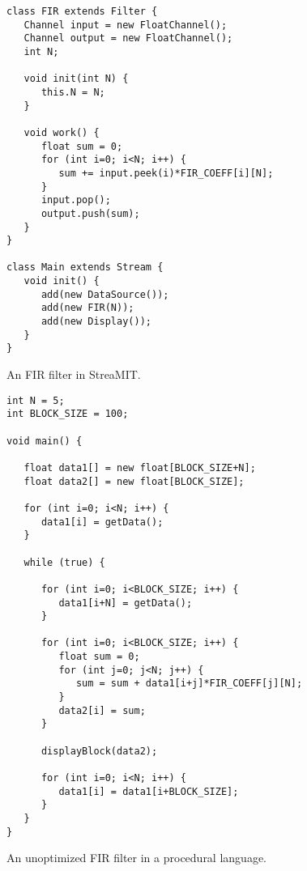 \begin{figure}
\scriptsize
\begin{verbatim}
class FIR extends Filter {
   Channel input = new FloatChannel();
   Channel output = new FloatChannel();
   int N;

   void init(int N) {
      this.N = N;
   }

   void work() {
      float sum = 0;
      for (int i=0; i<N; i++) {
         sum += input.peek(i)*FIR_COEFF[i][N];
      }
      input.pop();
      output.push(sum);
   }
}

class Main extends Stream {
   void init() {
      add(new DataSource());
      add(new FIR(N));
      add(new Display());
   }
}
\end{verbatim}
\vspace{-12pt}
\caption{\protect\small An FIR filter in StreaMIT.
\protect\label{fig:firstreamit}}
\vspace{-12pt}
\end{figure}

\begin{figure}
\scriptsize
\begin{verbatim}
int N = 5;
int BLOCK_SIZE = 100;

void main() {

   float data1[] = new float[BLOCK_SIZE+N];
   float data2[] = new float[BLOCK_SIZE];

   for (int i=0; i<N; i++) {
      data1[i] = getData();
   }

   while (true) {

      for (int i=0; i<BLOCK_SIZE; i++) {
         data1[i+N] = getData();
      }

      for (int i=0; i<BLOCK_SIZE; i++) {
         float sum = 0;
         for (int j=0; j<N; j++) {
            sum = sum + data1[i+j]*FIR_COEFF[j][N];
         }
         data2[i] = sum;
      }

      displayBlock(data2);

      for (int i=0; i<N; i++) {
         data1[i] = data1[i+BLOCK_SIZE];
      }
   }
}
\end{verbatim}
\vspace{-12pt}
\caption{\protect\small An unoptimized FIR filter in a procedural language.
\protect\label{fig:firprocedural}}
\vspace{-12pt}
\end{figure}

